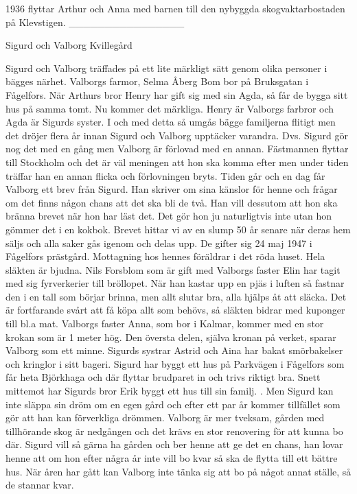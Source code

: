 1936 flyttar Arthur och Anna med barnen till den  nybyggda skogvaktarbostaden på Klevstigen.
________________








Sigurd och Valborg Kvillegård




Sigurd och Valborg träffades på ett lite märkligt sätt genom olika personer i bägges närhet.
Valborgs farmor, Selma Åberg Bom bor på Bruksgatan i Fågelfors. När Arthurs bror Henry har gift sig med sin Agda, så får de bygga sitt hus på samma tomt.
Nu kommer det märkliga. Henry är Valborgs farbror och Agda är Sigurds syster. I och med detta så umgås bägge familjerna flitigt men det dröjer flera år innan Sigurd och Valborg upptäcker varandra.
Dvs. Sigurd gör nog det med en gång men Valborg är förlovad med en annan. Fästmannen flyttar till Stockholm och det är väl meningen att hon ska komma efter men under tiden träffar han en annan flicka och förlovningen bryts.
Tiden går och en dag får Valborg ett brev från Sigurd. Han skriver om sina känslor för henne och frågar om det finns någon chans att det ska bli de två. Han vill dessutom att hon ska bränna brevet när hon har läst det. Det gör hon ju naturligtvis inte utan hon gömmer det i en kokbok. Brevet hittar vi av en slump 50 år senare när deras hem säljs och alla saker gås igenom och delas upp.
De gifter sig 24 maj 1947 i Fågelfors prästgård. Mottagning hos hennes föräldrar i det röda huset. Hela släkten är bjudna. Nils Forsblom som är gift med Valborgs faster Elin har tagit med sig fyrverkerier till bröllopet. När han kastar upp en pjäs i luften så fastnar den i en tall som börjar brinna, men allt slutar bra, alla hjälps åt att släcka.
Det är fortfarande svårt att få köpa allt som behövs, så släkten bidrar med kuponger till bl.a mat. Valborgs faster Anna, som bor i Kalmar, kommer med en stor krokan som är 1 meter hög. Den översta delen, själva kronan på verket, sparar Valborg som ett minne. Sigurds systrar Astrid och Aina har bakat smörbakelser och kringlor i sitt bageri.
Sigurd har byggt ett hus på Parkvägen i Fågelfors som får heta Björkhaga och där flyttar brudparet in och trivs riktigt bra. Snett mittemot har Sigurds bror Erik byggt ett  hus till sin familj.  .
Men Sigurd kan inte släppa sin dröm om en egen gård och efter ett par år kommer tillfället som gör att han kan förverkliga drömmen. Valborg är mer tveksam, gården med tillhörande skog är nedgången och det krävs en stor renovering för att kunna bo där. Sigurd vill så gärna ha gården och ber henne att ge det en chans, han lovar henne att om hon efter några år inte vill bo kvar så ska de flytta till ett bättre hus. När åren har gått kan Valborg inte tänka sig att bo på något annat ställe, så de stannar kvar.


